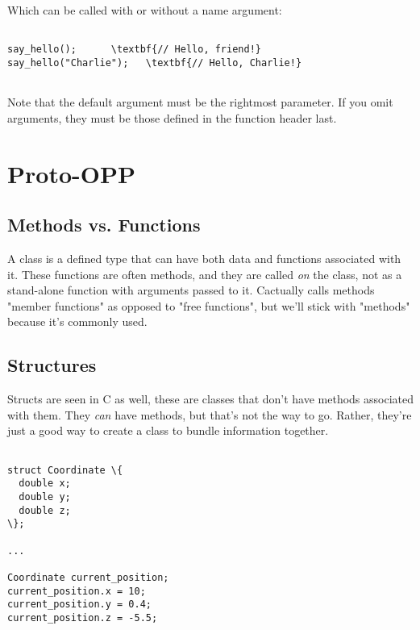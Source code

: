 \documentclass{IEEEtran}
\newcommand{\cpp}{C\nolinebreak\hspace{-.05em}\raisebox{.15ex}{\small\bf +}\nolinebreak\hspace{-.10em}\raisebox{.15ex}{\small\bf+\ }}
\begin{document}
Which can be called with or without a name argument:

\begin{Verbatim}[fontsize=\scriptsize, xleftmargin=.3in, commandchars=\\\{\}]
          
say_hello();      \textbf{// Hello, friend!}
say_hello("Charlie");   \textbf{// Hello, Charlie!}
  
\end{Verbatim}

Note that the default argument must be the rightmost parameter.  If you omit arguments, they must be those defined in the function header last.
  
\section{Proto-OPP}


\subsection{Methods vs. Functions}


A class is a defined type that can have both data and functions associated with it. These functions are often methods, and they are called \textit{on} the class, not as a stand-alone function with arguments passed to it. \cpp actually calls methods "member functions" as opposed to "free functions", but we'll stick with "methods" because it's commonly used.

\subsection{Structures}

Structs are seen in C as well, these are classes that don't have methods associated with them. They \textit{can} have methods, but that's not the way to go. Rather, they're just a good way to create a class to bundle information together.

\begin{Verbatim}[fontsize=\scriptsize, xleftmargin=.3in, commandchars=\\\{\}]
          
struct Coordinate \{
  double x; 
  double y;
  double z;
\};
  
...

Coordinate current_position;
current_position.x = 10;
current_position.y = 0.4;
current_position.z = -5.5;    
  
\end{Verbatim}
\end{document}
